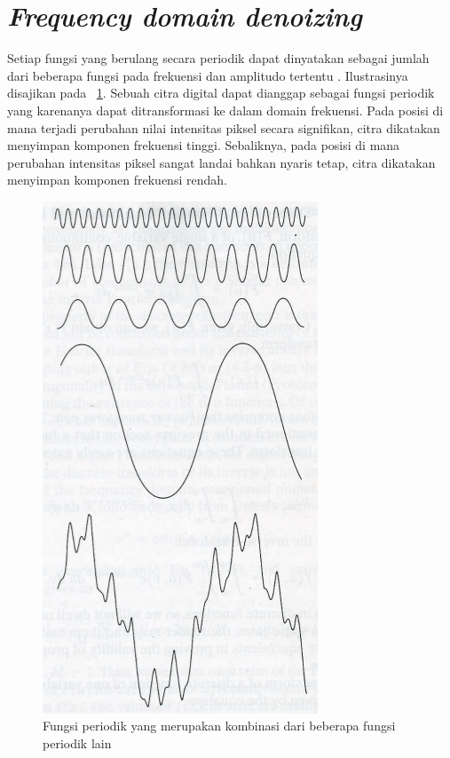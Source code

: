 \section{\textit{Frequency domain denoizing}}
Setiap fungsi yang berulang secara periodik dapat dinyatakan sebagai jumlah dari beberapa fungsi pada frekuensi dan amplitudo tertentu \cite{Gonzalez}. Ilustrasinya disajikan pada \figurename~\ref{fig:periodik}. Sebuah citra digital dapat dianggap sebagai fungsi periodik yang karenanya dapat ditransformasi ke dalam domain frekuensi. Pada posisi di mana terjadi perubahan nilai intensitas piksel secara signifikan, citra dikatakan menyimpan komponen frekuensi tinggi. Sebaliknya, pada posisi di mana perubahan intensitas piksel sangat landai bahkan nyaris tetap, citra dikatakan menyimpan komponen frekuensi rendah.

\begin{figure}
  \begin{center}
    \includegraphics[scale=.5]{pics/fourierBasic.png}
    \caption{Fungsi periodik yang merupakan kombinasi dari beberapa fungsi periodik lain}
    \label{fig:periodik}
  \end{center}
\end{figure}

